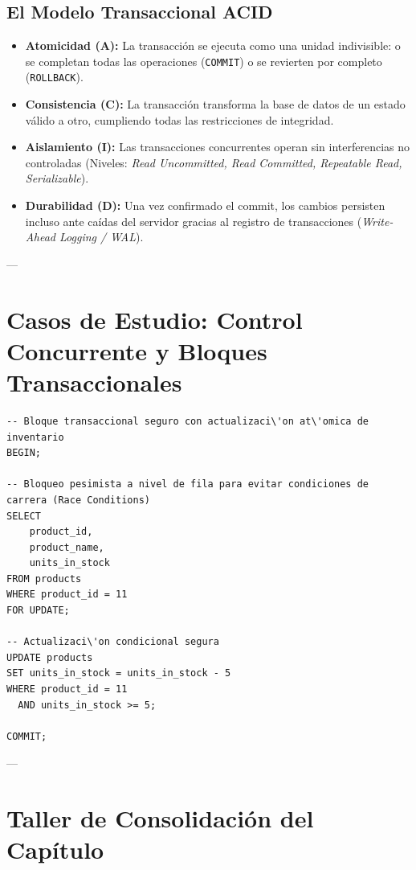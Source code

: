 \subsection{El Modelo Transaccional ACID}
\begin{itemize}
    \item \textbf{Atomicidad (A):} La transacci\'on se ejecuta como una unidad indivisible: o se completan todas las operaciones (\texttt{COMMIT}) o se revierten por completo (\texttt{ROLLBACK}).
    \item \textbf{Consistencia (C):} La transacci\'on transforma la base de datos de un estado v\'alido a otro, cumpliendo todas las restricciones de integridad.
    \item \textbf{Aislamiento (I):} Las transacciones concurrentes operan sin interferencias no controladas (Niveles: \textit{Read Uncommitted, Read Committed, Repeatable Read, Serializable}).
    \item \textbf{Durabilidad (D):} Una vez confirmado el commit, los cambios persisten incluso ante ca\'idas del servidor gracias al registro de transacciones (\textit{Write-Ahead Logging / WAL}).
\end{itemize}

---

\section{Casos de Estudio: Control Concurrente y Bloques Transaccionales}

\begin{lstlisting}[style=sqlstyle, caption={Manejo seguro de transacciones con bloqueo expl\'icito}]
-- Bloque transaccional seguro con actualizaci\'on at\'omica de inventario
BEGIN;

-- Bloqueo pesimista a nivel de fila para evitar condiciones de carrera (Race Conditions)
SELECT
    product_id,
    product_name,
    units_in_stock
FROM products
WHERE product_id = 11
FOR UPDATE;

-- Actualizaci\'on condicional segura
UPDATE products
SET units_in_stock = units_in_stock - 5
WHERE product_id = 11
  AND units_in_stock >= 5;

COMMIT;
\end{lstlisting}

---

\section{Taller de Consolidaci\'on del Cap\'itulo}

